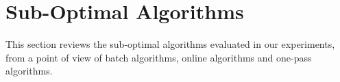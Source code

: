 \newtheorem{theorem}{Theorem}
\newtheorem{lemma}{Lemma}

\vspace{-1ex}
\section{Sub-Optimal Algorithms}
\label{sec-subopt}



This section reviews the sub-optimal \lsa algorithms evaluated in our experiments, from a point of view of batch algorithms, online algorithms and one-pass algorithms.









